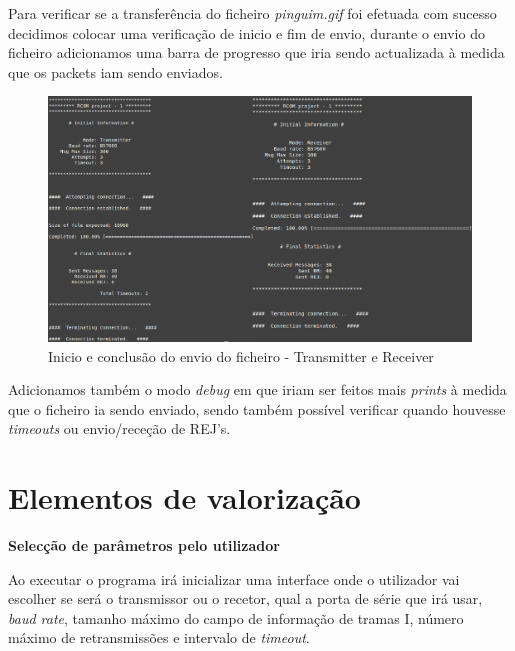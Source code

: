 \documentclass[11pt]{article}
\begin{document}
Para verificar se a transferência do ficheiro \textit{pinguim.gif} foi efetuada com sucesso decidimos colocar uma verificação de inicio e fim de envio,  durante o envio do ficheiro adicionamos uma barra de progresso que iria sendo actualizada à medida que os packets iam sendo enviados. 

\begin{figure}[h!]
\hspace*{-1.2cm}\includegraphics[scale=0.95]{transrec.png}
\caption{Inicio e conclusão do envio do ficheiro - Transmitter e Receiver}
\label{fig:codigoFigura}
\end{figure}

\par Adicionamos também o modo \textit{debug} em que iriam ser feitos mais \textit{prints} à medida que o ficheiro ia sendo enviado, sendo também possível verificar quando houvesse \textit{timeouts} ou envio/receção de REJ's. 






\newpage
\section{ Elementos de valorização}

\textbf{Selecção de parâmetros pelo utilizador}
\par Ao executar o programa irá inicializar uma interface onde o utilizador vai escolher se será o transmissor ou o recetor, qual a porta de série que irá usar, \textit{baud rate}, tamanho máximo do campo de informação de tramas I, número máximo de retransmissões e intervalo de \textit{timeout}.\newline
\end{document}
